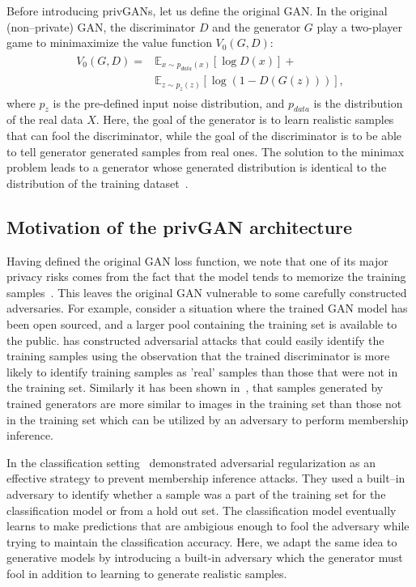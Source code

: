 \documentclass{article}
\begin{document}
Before introducing privGANs, let us define the original GAN. In the original (non--private) GAN, the discriminator $D$ and the generator $G$ play a two-player game to minimaximize the value function $V_0(G,D)$:
\begin{align}
\label{eqn:V0}
    \begin{split}
        V_0(G,D) =& \mathbb{E}_{x\sim p_{data}(x)}[\log D(x)]+ \\
    &\mathbb{E}_{z\sim p_{z}(z)}[\log(1-D(G(z)))],
    \end{split}
\end{align}
where $p_z$ is the pre-defined input noise distribution, and $p_{data}$ is the distribution of the real data $X$. Here, the goal of the generator is to learn realistic samples that can fool the discriminator, while the goal of the discriminator is to be able to tell generator generated samples from real ones. The solution to the minimax problem leads to a generator whose generated distribution is identical to the distribution of the training dataset~\cite{goodfellow2014generative}. 

\subsection{Motivation of the privGAN architecture}
Having defined the original GAN loss function, we note that one of its major privacy risks comes from the fact that the model tends to memorize the training samples~\cite{liu2018generative,yeom2018privacy}. This leaves the original GAN vulnerable to some carefully constructed adversaries. For example, consider a situation where the trained GAN model has been open sourced, and a larger pool containing the training set is available to the public. \cite{hayes2019logan} has constructed adversarial attacks that could easily identify the training samples using the observation that the trained discriminator is more likely to identify training samples as 'real' samples than those that were not in the training set. Similarly it has been shown in~\cite{hilprecht2019monte}, that samples generated by trained generators are more similar to images in the training set than those not in the training set which can be utilized by an adversary to perform membership inference.

In the classification setting~\cite{nasr2018machine} demonstrated adversarial regularization as an effective strategy to prevent membership inference attacks. They used a built--in adversary to identify whether a sample was a part of the training set for the classification model or from a hold out set. The classification model eventually learns to make predictions that are ambigious enough to fool the adversary while trying to maintain the classification accuracy. Here, we adapt the same idea to generative models by introducing a built-in adversary which the generator must fool in addition to learning to generate realistic samples. 
\end{document}
